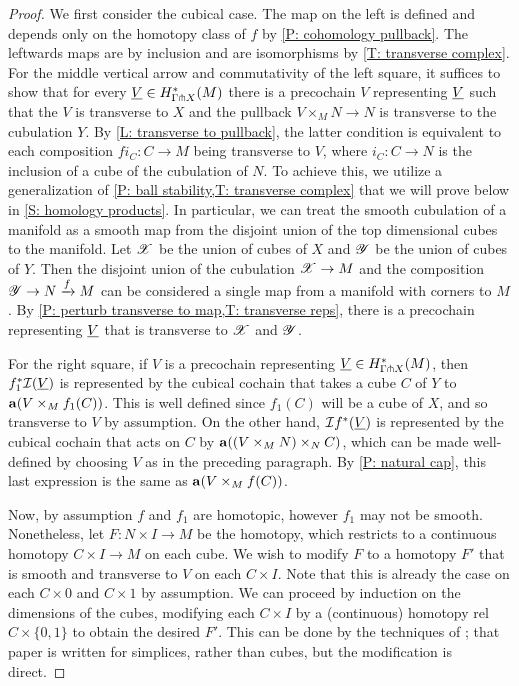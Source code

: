\begin{proof}
	We first consider the cubical case.
	The map on the left is defined and depends only on the homotopy class of $f$ by \cref{P: cohomology pullback}.
	The leftwards maps are by inclusion and are isomorphisms by \cref{T: transverse complex}.
	For the middle vertical arrow and commutativity of the left square, it suffices to show that for every $\underline{V} \in H^*_{\Gamma \pitchfork X}(M)$ there is a precochain $V$ representing $\underline{V}$ such that the $V$ is transverse to $X$ and the pullback $V \times_M N \to N$ is transverse to the cubulation $Y$.
	By \cref{L: transverse to pullback}, the latter condition is equivalent to each composition $fi_C \colon C \to M$ being transverse to $V$, where $i_C \colon C \to N$ is the inclusion of a cube of the cubulation of $N$.
	To achieve this, we utilize a generalization of \cref{P: ball stability,T: transverse complex} that we will prove below in \cref{S: homology products}.
	In particular, we can treat the smooth cubulation of a manifold as a smooth map from the disjoint union of the top dimensional cubes to the manifold.
	Let $\mathscr{X}$ be the union of cubes of $X$ and $\mathscr{Y}$ be the union of cubes of $Y$.
	Then the disjoint union of the cubulation $\mathscr{X} \to M$ and the composition $\mathscr{Y} \to N \xrightarrow{f} M$ can be considered a single map from a manifold with corners to $M$.
	By \cref{P: perturb transverse to map,T: transverse reps}, there is a precochain representing $\underline{V}$ that is transverse to $\mathscr{X}$ and $\mathscr{Y}$.

	For the right square, if $V$ is a precochain representing $\underline{V} \in H^*_{\Gamma \pitchfork X}(M)$, then $f_1^* \mathcal{I}(\underline{V})$ is represented by the cubical cochain that takes a cube $C$ of $Y$ to $\mathbf{a}(V \times_M f_1(C))$.
	This is well defined since $f_1(C)$ will be a cube of $X$, and so transverse to $V$ by assumption.
	On the other hand, $\mathcal{I} f^*(\underline{V})$ is represented by the cubical cochain that acts on $C$ by $\mathbf{a}((V \times_M N) \times_N C)$, which can be made well-defined by choosing $V$ as in the preceding paragraph.
	By \cref{P: natural cap}, this last expression is the same as $\mathbf{a}(V \times_M f(C))$.


	Now, by assumption $f$ and $f_1$ are homotopic, however $f_1$ may not be smooth.
	Nonetheless, let $F \colon N \times I \to M$ be the homotopy, which restricts to a continuous homotopy $C \times I \to M$ on each cube.
	We wish to modify $F$ to a homotopy $F'$ that is smooth and transverse to $V$ on each $C \times I$.
	Note that this is already the case on each $C \times 0$ and $C \times 1$ by assumption.
	We can proceed by induction on the dimensions of the cubes, modifying each $C \times I$ by a (continuous) homotopy rel $C \times \{0,1\}$ to obtain the desired $F'$.
	This can be done by the techniques of \cite{FMS-transversesingular}; that paper is written for simplices, rather than cubes, but the modification is direct.


\end{proof}
